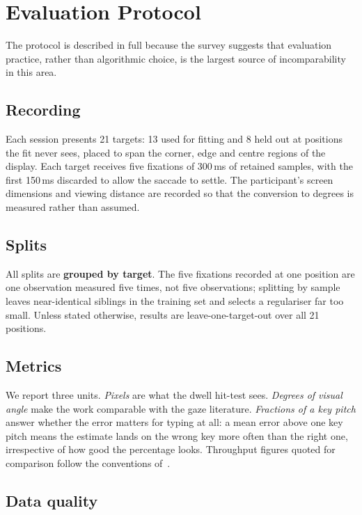 \documentclass[conference]{IEEEtran}
\begin{document}
\section{Evaluation Protocol}
\label{sec:protocol}

The protocol is described in full because the survey suggests that evaluation
practice, rather than algorithmic choice, is the largest source of
incomparability in this area.

\subsection{Recording}

Each session presents 21 targets: 13 used for fitting and 8 held out at
positions the fit never sees, placed to span the corner, edge and centre regions
of the display. Each target receives five fixations of 300\,ms of retained
samples, with the first 150\,ms discarded to allow the saccade to settle. The
participant's screen dimensions and viewing distance are recorded so that the
conversion to degrees is measured rather than assumed.

\subsection{Splits}

All splits are \textbf{grouped by target}. The five fixations recorded at one
position are one observation measured five times, not five observations;
splitting by sample leaves near-identical siblings in the training set and
selects a regulariser far too small. Unless stated otherwise, results are
leave-one-target-out over all 21 positions.

\subsection{Metrics}

We report three units. \emph{Pixels} are what the dwell hit-test sees.
\emph{Degrees of visual angle} make the work comparable with the gaze
literature. \emph{Fractions of a key pitch} answer whether the error matters for
typing at all: a mean error above one key pitch means the estimate lands on the
wrong key more often than the right one, irrespective of how good the percentage
looks. Throughput figures quoted for comparison follow the conventions
of~\cite{ref12}.

\subsection{Data quality}
\end{document}
